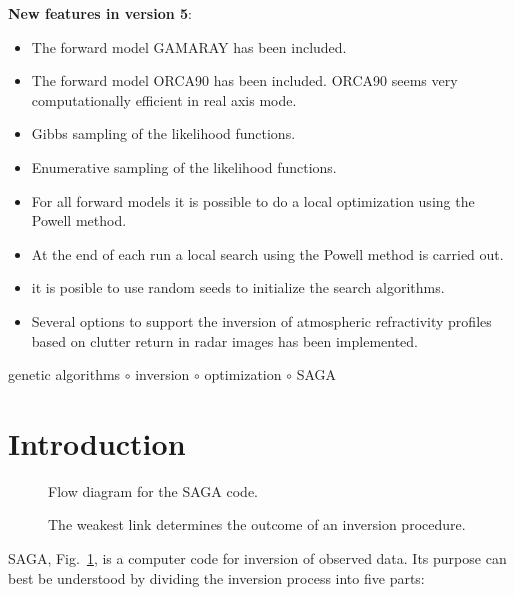 \documentclass{saclantc}
\begin{document}
\begin{prelims}
{\bf New features in version 5}:
\begin{itemize}
\vspace{-0.2cm}
\item The forward model {\sf GAMARAY} has been included.
\item The forward model {\sf ORCA90} has been included.
{\sf ORCA90} seems very computationally efficient in real axis mode.
\item Gibbs sampling of the likelihood functions.
\item Enumerative sampling of the likelihood functions.
\item For all forward models it is possible to do a local optimization
using the Powell method.
\item At the end of each run a local search using the Powell method
is carried out.
\item it is posible to use random seeds to initialize the search algorithms.
\item Several options to support the inversion of atmospheric
  refractivity profiles based on clutter return in radar images has
  been implemented.
\end{itemize}

\begin{keywords}
genetic algorithms $\circ$ inversion $\circ$ optimization $\circ$ SAGA
\end{keywords} 

\tableofcontents
\end{prelims}


\section{Introduction}

\begin{figure}
\epsfxsize=13cm
\centerline{}
\caption{Flow diagram for the {\sf SAGA} code.}
\label{fig:flow}
\end{figure}

\begin{figure}
\epsfysize=3cm
\centerline{}
\caption{The weakest link determines the outcome of an inversion procedure.}
\label{fig:chain}
\end{figure}

{\sf SAGA}, Fig.\ \ref{fig:flow},  is a computer code for inversion of observed data. 
Its purpose can best be understood by dividing the inversion process into 
five parts:
\end{document}
